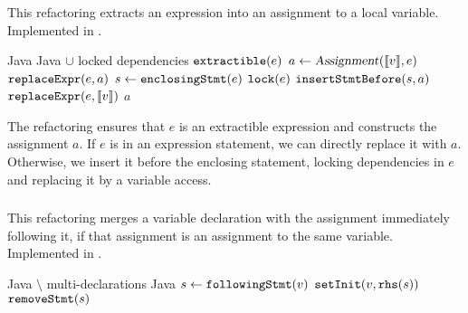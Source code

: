 \subsubsection{}
This refactoring extracts an expression into an assignment to a local variable. Implemented in .

\begin{algorithm}
\caption{$\refactoring{Extract Assignment}(v : \type{LocalVarDecl}, e : \type{Expr}) : \type{Assignment}$}
\begin{algorithmic}[1]
\REQUIRE Java
\ENSURE Java $\cup$ locked dependencies
\medskip
\STATE \assert $\text{\texttt{extractible}}(e)$
\STATE $a \leftarrow \text{\textsl{Assignment}}(\llbracket v\rrbracket, e)$
  \STATE $\text{\texttt{replaceExpr}}(e, a)$
\ELSE
  \STATE $s \leftarrow \text{\texttt{enclosingStmt}}(e)$
  \STATE $\text{\texttt{lock}}(e)$
  \STATE $\text{\texttt{insertStmtBefore}}(s, a)$
  \STATE $\text{\texttt{replaceExpr}}(e, \llbracket v\rrbracket)$
\ENDIF
\RETURN $a$
\end{algorithmic}
\end{algorithm}

The refactoring ensures that $e$ is an extractible expression and constructs the assignment $a$. If $e$ is in an expression statement, we can directly replace it with $a$. Otherwise, we insert it before the enclosing statement, locking dependencies in $e$ and replacing it by a variable access.

\subsubsection{}
This refactoring merges a variable declaration with the assignment immediately following it, if that assignment is an assignment to the same variable. Implemented in .

\begin{algorithm}
\caption{$\refactoring{Merge Variable Declaration}(v : \type{LocalVarDecl})$}
\begin{algorithmic}[1]
\REQUIRE Java $\setminus$ multi-declarations
\ENSURE Java
\medskip
{}
  \RETURN
\ENDIF
\STATE $s \leftarrow \text{\texttt{followingStmt}}(v)$
  \STATE $\text{\texttt{setInit}}(v, \text{\texttt{rhs}}(s))$
  \STATE $\text{\texttt{removeStmt}}(s)$
\ENDIF
\end{algorithmic}
\end{algorithm}
